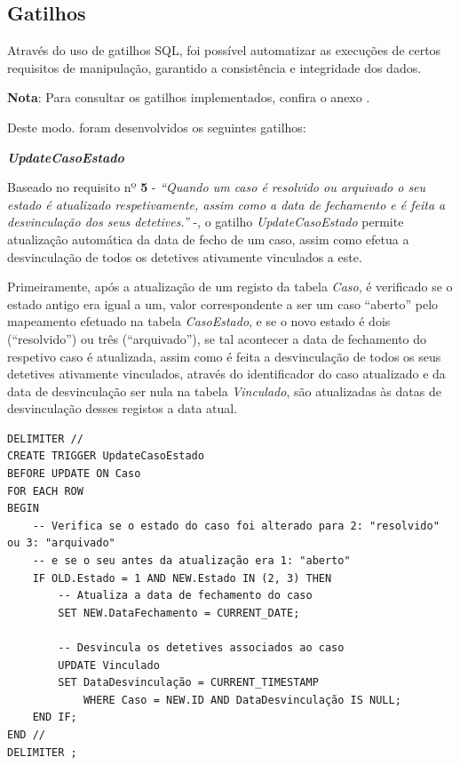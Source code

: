 \documentclass[a4paper,12pt]{scrreprt}
\begin{document}
\clearpage

\subsection{Gatilhos}

Através do uso de gatilhos SQL, foi possível automatizar as execuções de certos requisitos de manipulação, garantido a consistência e integridade dos dados.

\textbf{Nota}: Para consultar os gatilhos implementados, confira o anexo \textit{}.

Deste modo. foram desenvolvidos os seguintes gatilhos:

\textit{\textbf{UpdateCasoEstado}}

Baseado no requisito nº \textbf{5} - \textit{“Quando um caso é resolvido ou arquivado o seu estado é atualizado respetivamente, assim como a data de fechamento e é feita a desvinculação dos seus detetives.”} -, o gatilho \textit{UpdateCasoEstado} permite atualização automática da data de fecho de um caso, assim como efetua a desvinculação de todos os detetives ativamente vinculados a este.

Primeiramente, após a atualização de um registo da tabela \textit{Caso}, é verificado se o estado antigo era igual a um, valor correspondente a ser um caso “aberto” pelo mapeamento efetuado na tabela \textit{CasoEstado}, e se o novo estado é dois (“resolvido”) ou três (“arquivado”), se tal acontecer a data de fechamento do respetivo caso é atualizada, assim como é feita a desvinculação de todos os seus detetives ativamente vinculados, através do identificador do caso atualizado e da data de desvinculação ser nula na tabela \textit{Vinculado}, são atualizadas às datas de desvinculação desses registos a data atual.

\vspace{0.4cm}
\begin{lstlisting}[escapechar=!]
DELIMITER //
CREATE TRIGGER UpdateCasoEstado
BEFORE UPDATE ON Caso
FOR EACH ROW
BEGIN
    -- Verifica se o estado do caso foi alterado para 2: "resolvido" ou 3: "arquivado"
    -- e se o seu antes da atualização era 1: "aberto"
    IF OLD.Estado = 1 AND NEW.Estado IN (2, 3) THEN
        -- Atualiza a data de fechamento do caso
        SET NEW.DataFechamento = CURRENT_DATE;

        -- Desvincula os detetives associados ao caso
        UPDATE Vinculado
        SET DataDesvinculação = CURRENT_TIMESTAMP
            WHERE Caso = NEW.ID AND DataDesvinculação IS NULL;
    END IF;
END //
DELIMITER ;
\end{lstlisting}
\end{document}
